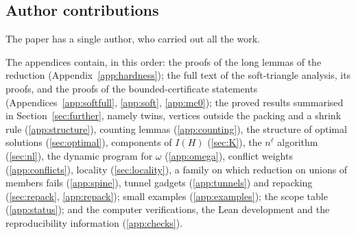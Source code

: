 \documentclass[pdflatex,sn-mathphys-num]{sn-jnl}
\theoremstyle{thmstyleone}
\theoremstyle{thmstylethree}
\begin{document}
\subsection*{Author contributions}
The paper has a single author, who carried out all the work.


\begin{appendices}
\noindent The appendices contain, in this order: the proofs of the long lemmas of the reduction (Appendix~\ref{app:hardness}); the full text of the soft-triangle analysis, its proofs, and the proofs of the bounded-certificate statements (Appendices~\ref{app:softfull}, \ref{app:soft}, \ref{app:mc0}); the proved results summarised in Section~\ref{sec:further}, namely twins, vertices outside the packing and a shrink rule (\ref{app:structure}), counting lemmas (\ref{app:counting}), the structure of optimal solutions (\ref{sec:optimal}), components of $I(H)$ (\ref{sec:K}), the $n^{\ell}$ algorithm (\ref{sec:nl}), the dynamic program for $\omega$ (\ref{app:omega}), conflict weights (\ref{app:conflicts}), locality (\ref{sec:locality}), a family on which reduction on unions of members fails (\ref{app:spine}), tunnel gadgets (\ref{app:tunnels}) and repacking (\ref{sec:repack}, \ref{app:repack}); small examples (\ref{app:examples}); the scope table (\ref{app:status}); and the computer verifications, the Lean development and the reproducibility information (\ref{app:checks}).




















\end{appendices}


\end{document}
